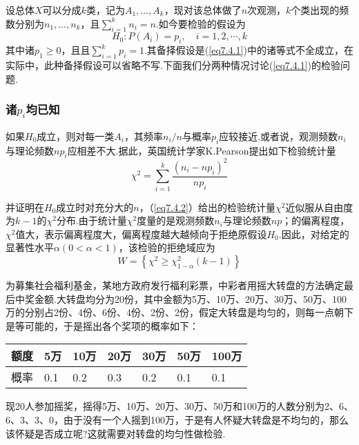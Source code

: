 设总体$X$可以分成$k$类，记为$A_{1},\dotsc,A_{k}$，现对该总体做了$n$次观测，$k$个类出现的频数分别为$n_{1},\dotsc,n_{k}$，且$\sum _ { i = 1 } ^ { k } n _ { i } = n$.如今要检验的假设为
\begin{equation}\label{eq7.4.1}
H _ { 0 } : P \left( A _ { i } \right) = p _ { i } , \quad i = 1,2 , \cdots , k
\end{equation}
其中诸$p_{1}\geq 0$，且且$\sum _ { i = 1 } ^ { k } p _ { i } = 1$.其备择假设是(\ref{eq7.4.1})中的诸等式不全成立，在实际中，此种备择假设可以省略不写.下面我们分两种情况讨论(\ref{eq7.4.1})的检验问题.

\subsubsection{诸$p_{i}$均已知}


如果$H_{0}$成立，则对每一类$A_{i}$，其频率$n_{i}/n$与概率$p_{i}$应较接近.或者说，观测频数$n_{i}$与理论频数$np_{i}$应相差不大.据此，英国统计学家K.Pearson提出如下检验统计量
\begin{equation}\label{eq7.4.2}
\chi ^ { 2 } = \sum _ { i = 1 } ^ { k } \frac { \left( n _ { i } - n p _ { i } \right) ^ { 2 } } { n p _ { i } }
\end{equation}


并证明在$H_{0}$成立时对充分大的$n$，（\ref{eq7.4.2}）给出的检验统计量$\chi^{2}$近似服从自由度为$k-1$的$\chi^{2}$分布.由于统计量$\chi^{2}$度量的是观测频数$n_{i}$与理论频数$np$；的偏离程度，$\chi^{2}$值大，表示偏离程度大，偏离程度越大越倾向于拒绝原假设$H_{0}$.因此，对给定的显著性水平$\alpha(0<\alpha<1)$，该检验的拒绝域应为
\begin{equation}\label{eq7.4.3}
W=\left\{\chi^2\geq\chi_{1-\alpha}^{2}\left(k-1\right)\right\}
\end{equation}
\begin{example}\label{exam7.4.1}
	为募集社会福利基金，某地方政府发行福利彩票，中彩者用摇大转盘的方法确定最后中奖金额.大转盘均分为20份，其中金额为5万、10万、20万、30万、50万、100万的分别占2份、4份、6份、4份、2份、2份，假定大转盘是均匀的，则每一点朝下是等可能的，于是摇出各个奖项的概率如下：
	
	\begin{table}[!htp]
		\centering
		\begin{tabularx}{0.6\textwidth}{Z|ZZZZZZ}
			额度&5万&10万&20万&30万&50万&100万\\
			\midrule
			概率&0.1&0.2&0.3&0.2&0.1&0.1
		\end{tabularx}
	\end{table}
	现20人参加摇奖，摇得5万、10万、20万、30万、50万和100万的人数分别为2、6、6、3、3、0，由于没有一个人摇到100万，于是有人怀疑大转盘是不均匀的，那么该怀疑是否成立呢?这就需要对转盘的均匀性做检验.
\end{example}

